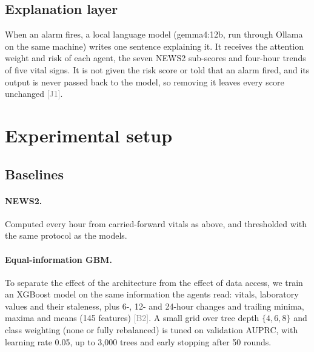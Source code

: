 \documentclass[11pt]{article}
\newcommand{\ev}[1]{\textcolor{gray}{\scriptsize[#1]}}   %
\begin{document}
\subsection{Explanation layer}
When an alarm fires, a local language model (gemma4:12b, run through Ollama on
the same machine) writes one sentence explaining it. It receives the attention
weight and risk of each agent, the seven NEWS2 sub-scores and four-hour trends
of five vital signs. It is not given the risk score or told that an alarm
fired, and its output is never passed back to the model, so removing it leaves
every score unchanged \ev{J1}.

\section{Experimental setup}\label{sec:experiments}

\subsection{Baselines}
\paragraph{NEWS2.} Computed every hour from carried-forward vitals as above,
and thresholded with the same protocol as the models.

\paragraph{Equal-information GBM.} To separate the effect of the architecture
from the effect of data access, we train an XGBoost model on the same
information the agents read: vitals, laboratory values and their staleness,
plus 6-, 12- and 24-hour changes and trailing minima, maxima and means (145
features) \ev{B2}. A small grid over tree depth $\{4, 6, 8\}$ and class
weighting (none or fully rebalanced) is tuned on validation AUPRC, with
learning rate 0.05, up to 3{,}000 trees and early stopping after 50 rounds.
\end{document}
